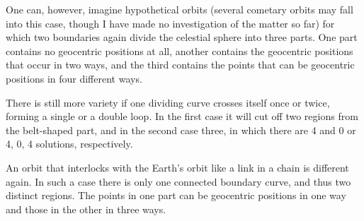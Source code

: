 One can, however, imagine hypothetical orbits\HistoricalNoteDouble{See Note 18.]} (several cometary orbits may fall into this case, though I have made no investigation of the matter so far) for which two boundaries again divide the celestial sphere into three parts. One part contains no geocentric positions at all, another contains the geocentric positions that occur in two ways, and the third contains the points that can be geocentric positions in four different ways.

There is still more variety if one dividing curve crosses itself once or twice, forming a single or a double loop. In the first case it will cut off two regions from the belt-shaped part, and in the second case three, in which there are 4 and 0 or 4, 0, 4 solutions, respectively.

An orbit that interlocks with the Earth's orbit like a link in a chain is different again. In such a case there is only one connected boundary curve, and thus two distinct regions. The points in one part can be geocentric positions in one way and those in the other in three ways.

